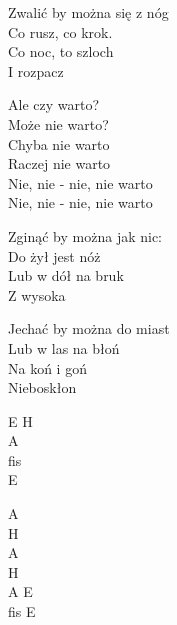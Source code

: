 \begin{text}
    Zwalić by można się z nóg\\
    Co rusz, co krok.\\
    Co noc, to szloch\\
    I rozpacz

    Ale czy warto?\\
    Może nie warto?\\
    Chyba nie warto\\
    Raczej nie warto\\
    Nie, nie - nie, nie warto\\
    Nie, nie - nie, nie warto

    Zginąć by można jak nic:\\
    Do żył jest nóż\\
    Lub w dół na bruk\\
    Z wysoka

    Jechać by można do miast\\
    Lub w las na błoń\\
    Na koń i goń\\
    Nieboskłon
\end{text}
\begin{chord}
    E H\\
    A\\
    fis\\
    E

    A\\
    H\\
    A\\
    H\\
    A E\\
    fis E
\end{chord}